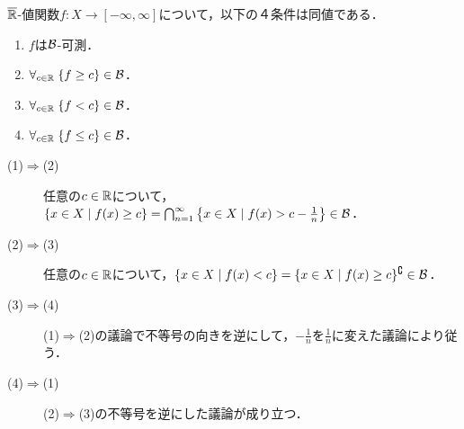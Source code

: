 \documentclass[uplatex, dvipdfmx]{jsreport}
\begin{document}
\begin{lemma}[拡張実可測関数の特徴付け]\label{lemma-characterization-of-measurable-function}
    $\overline{\mathbb{R}}$-値関数$f:X\to[-\infty,\infty]$について，以下の４条件は同値である．
    \begin{enumerate}
        \item $f$は$\mathcal{B}$-可測．
        \item $\forall_{c\in\mathbb{R}}\;\{f\ge c\}\in\mathcal{B}$．
        \item $\forall_{c\in\mathbb{R}}\;\{f< c\}\in\mathcal{B}$．
        \item $\forall_{c\in\mathbb{R}}\;\{f\le c\}\in\mathcal{B}$．
    \end{enumerate}
\end{lemma}
\begin{Proof}\mbox{}
    \begin{description}
        \item[(1)$\Rightarrow$(2)] 任意の$c\in\mathbb{R}$について，$\{x\in X\mid f(x)\ge c\}=\bigcap_{n=1}^\infty\left\{x\in X\mid f(x)>c-\frac{1}{n}\right\}\in\mathcal{B}$．
        \item[(2)$\Rightarrow$(3)] 任意の$c\in\mathbb{R}$について，$\{x\in X\mid f(x)< c\}=\{x\in X\mid f(x)\ge c\}^\complement\in\mathcal{B}$．
        \item[(3)$\Rightarrow$(4)] (1)$\Rightarrow$(2)の議論で不等号の向きを逆にして，$-\frac{1}{n}$を$\frac{1}{n}$に変えた議論により従う．
        \item[(4)$\Rightarrow$(1)] (2)$\Rightarrow$(3)の不等号を逆にした議論が成り立つ．
    \end{description}
\end{Proof}
\end{document}
